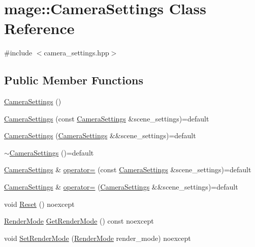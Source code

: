\hypertarget{classmage_1_1_camera_settings}{}\section{mage\+:\+:Camera\+Settings Class Reference}
\label{classmage_1_1_camera_settings}


{\ttfamily \#include $<$camera\+\_\+settings.\+hpp$>$}

\subsection*{Public Member Functions}
\begin{DoxyCompactItemize}
\item 
\hyperlink{classmage_1_1_camera_settings_a08e24d87d4441af780a3f34504a41118}{Camera\+Settings} ()
\item 
\hyperlink{classmage_1_1_camera_settings_a9dc529822866523b62b7d9388e04c5fd}{Camera\+Settings} (const \hyperlink{classmage_1_1_camera_settings}{Camera\+Settings} \&scene\+\_\+settings)=default
\item 
\hyperlink{classmage_1_1_camera_settings_a006a0cb2758137b14c65c4788f25d41e}{Camera\+Settings} (\hyperlink{classmage_1_1_camera_settings}{Camera\+Settings} \&\&scene\+\_\+settings)=default
\item 
\hyperlink{classmage_1_1_camera_settings_a738a93dc2e1aed2cac7a58af658984f3}{$\sim$\+Camera\+Settings} ()=default
\item 
\hyperlink{classmage_1_1_camera_settings}{Camera\+Settings} \& \hyperlink{classmage_1_1_camera_settings_aaabd402e2e9510d0e44ec31320baff87}{operator=} (const \hyperlink{classmage_1_1_camera_settings}{Camera\+Settings} \&scene\+\_\+settings)=default
\item 
\hyperlink{classmage_1_1_camera_settings}{Camera\+Settings} \& \hyperlink{classmage_1_1_camera_settings_a5104072c8c15e8dfc0b9459a537afe5e}{operator=} (\hyperlink{classmage_1_1_camera_settings}{Camera\+Settings} \&\&scene\+\_\+settings)=default
\item 
void \hyperlink{classmage_1_1_camera_settings_a4894cae6954c111339be554e8dd9562c}{Reset} () noexcept
\item 
\hyperlink{namespacemage_a5e7e18b0154373ce8fc942fe3f6b27fd}{Render\+Mode} \hyperlink{classmage_1_1_camera_settings_a6673291bcfed8fa2c0a0041bf8f97f24}{Get\+Render\+Mode} () const noexcept
\item 
void \hyperlink{classmage_1_1_camera_settings_ab0d6720a08e88e018c2a2e6097933d98}{Set\+Render\+Mode} (\hyperlink{namespacemage_a5e7e18b0154373ce8fc942fe3f6b27fd}{Render\+Mode} render\+\_\+mode) noexcept

\end{DoxyCompactItemize}
